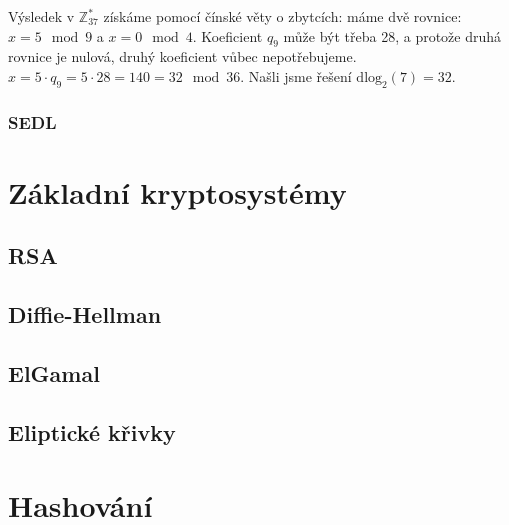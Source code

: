 \documentclass[10pt,a4paper]{article}
\begin{document}
Výsledek v $\mathbb{Z}_{37}^*$ získáme pomocí čínské věty o zbytcích: máme dvě rovnice: $x = 5 \mod 9$ a $x = 0 \mod 4$. Koeficient $q_9$ může být třeba 28, a protože druhá rovnice je nulová, druhý koeficient vůbec nepotřebujeme. $x = 5\cdot q_9 = 5\cdot 28 = 140 = 32 \mod 36$. Našli jsme řešení $\text{dlog}_2(7) = 32$.

\subsubsection{SEDL}

\section{Základní kryptosystémy}
\subsection{RSA}
\subsection{Diffie-Hellman}
\subsection{ElGamal}
\subsection{Eliptické křivky}

\section{Hashování}
\end{document}

